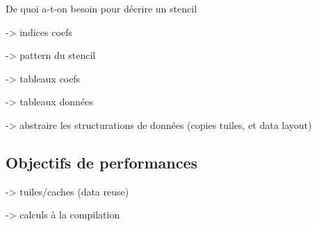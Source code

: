 De quoi a-t-on besoin pour décrire un stencil

-> indices coefs

-> pattern du stencil

-> tableaux coefs

-> tableaux données

-> abstraire les structurations de données (copies tuiles, et data layout)

\subsection{Objectifs de performances}

-> tuiles/caches (data reuse)

-> calculs à la compilation

